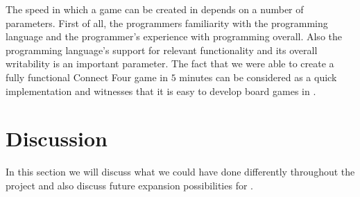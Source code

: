 The speed in which a game can be created in \productname{} depends on a number
of parameters. First of all, the programmers familiarity with the programming
language and the programmer's experience with programming overall. Also the
programming language's support for relevant functionality and its overall
writability is an important parameter. The fact that we were able to create a
fully functional Connect Four game in $5$ minutes can be considered as a quick
implementation and witnesses that it is easy to develop board games in
\productname{}.

\section{Discussion}
\label{sec:discussion}

In this section we will discuss what we could have done differently throughout
the project and also discuss future expansion possibilities for \productname{}.

%






